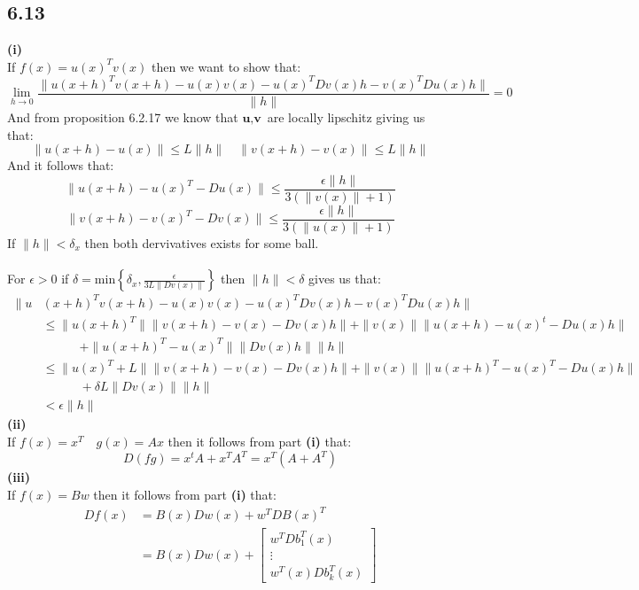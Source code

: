 \documentclass[letterpaper,12pt]{article}
\theoremstyle{definition}
\begin{document}
\subsection*{6.13}
\textbf{(i)}\\
If $f(x) = u(x)^Tv(x)$ then we want to show that:
\[ \lim_{h \to 0} \frac{\| u (x+h)^Tv(x+h) - u(x)v(x) - u(x)^TDv(x)h - v(x)^TDu(x)h\|}{\|h\|} = 0\]
And from proposition 6.2.17 we know that $\textbf{u},\textbf{v}$ are locally lipschitz giving us that:
\[\|u(x+h)-u(x)\| \leq L\|h\| \quad \|v(x+h)-v(x)\| \leq L\|h\|\]
And it follows that:
\[    \|u(x+h) - u(x)^T - Du(x)\| \leq \frac{\epsilon \|h\|}{3(\|v(x)\|+1)}\]
\[   \|v(x+h) - v(x)^T - Dv(x)\| \leq \frac{\epsilon \|h\|}{3(\|u(x)\|+1)}\]
If $\|h\| <\delta_x$ then both dervivatives exists for some ball.\\
\\
For $\epsilon > 0$ if $\delta = \text{min} \left\{ \delta_x, \frac{\epsilon}{3L\|Dv(x)\|}\right\}$ then $\|h\| < \delta$ gives us that:
\begin{align*}
    \| u &(x+h)^Tv(x+h) - u(x)v(x) - u(x)^TDv(x)h - v(x)^TDu(x)h\| \\
    & \leq \|u(x+h)^T\|\|v(x+h)-v(x)-Dv(x)h\| + \|v(x)\|\|u(x+h)-u(x)^t - Du(x)h\|\\
    & \quad \quad \quad     +\|u(x+h)^T-u(x)^T\|\|Dv(x)h\|\|h\|\\
    & \leq \|u(x)^T + L\|\|v(x+h) - v(x) - Dv(x)h\| + \|v(x)\|\|u(x+h)^T-u(x)^T - Du(x)h\| \\
    & \quad \quad \quad     + \delta L\|Dv(x)\|\|h\|\\
    & < \epsilon \|h\|
\end{align*}
\textbf{(ii)}\\
If $f(x)= x^T \quad g(x) = Ax$ then it follows from part \textbf{(i)} that:
\[D(fg) = x^tA + x^TA^T = x^T(A+A^T)\]
\textbf{(iii)}\\
If $f(x) = Bw$ then it follows from part \textbf{(i)} that:
\begin{align*}
    Df(x) &= B(x)Dw(x) + w^TDB(x)^T\\
    &= B(x)Dw(x) + \begin{bmatrix} w^TDb_1^T(x)\\
        \vdots \\
        w^T(x)Db_k^T(x)
    \end{bmatrix}
\end{align*}
\end{document}

